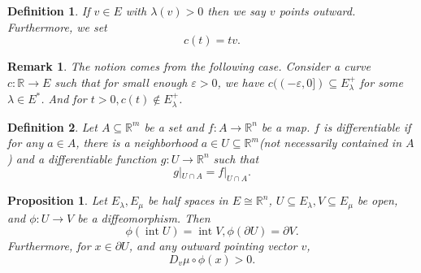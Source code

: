 \documentclass[10pt]{article}
\newtheorem{proposition}{Proposition}[section]
\newtheorem{definition}{Definition}[section]
\newtheorem{remark}{Remark}[section]
\DeclareMathOperator{\interior}{int}
\newcommand{\R}[0]{\mathbb{R}}
\begin{document}
\begin{definition}
  If $v\in E$ with $\lambda(v)>0$ then we say $v$ points outward. Furthermore, we set 
  \begin{equation*}
    c(t) = tv.
  \end{equation*}
\end{definition}

\begin{remark}
  The notion comes from the following case. Consider a curve $c:\R\to E$ such that for small enough $\varepsilon>0$, we have $c((-\varepsilon,0])\subseteq E_\lambda^+$ for some $\lambda\in E^*$. And for $t>0, c(t)\not\in E_\lambda^+$. 
\end{remark}

\begin{definition}
  Let $A\subseteq\R^m$ be a set and $f:A\to\R^n$ be a map. $f$ is differentiable if for any $a\in A$, there is a neighborhood $a\in U\subseteq\R^m$(not necessarily contained in $A$) and a differentiable function $g:U\to\R^n$ such that 
  \begin{equation*}
    g|_{U\cap A} = f|_{U\cap A}.
  \end{equation*}
\end{definition}

\begin{proposition}
  Let $E_\lambda,E_\mu$ be half spaces in $E\cong \R^n$, $U\subseteq E_\lambda,V\subseteq E_\mu$ be open, and $\phi:U\to V$ be a diffeomorphism. Then 
  \begin{equation*}
    \phi(\interior U) = \interior V, \phi(\partial U) = \partial V.
  \end{equation*}
  Furthermore, for $x\in\partial U$, and any outward pointing vector $v$, 
  \begin{equation*}
    D_v\mu\circ\phi(x)>0.
  \end{equation*}
\end{proposition}
\end{document}
